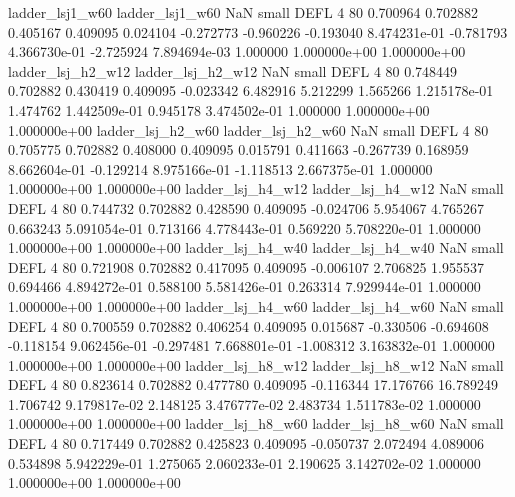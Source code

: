          ladder_lsj1_w60          ladder_lsj1_w60                   NaN      small     DEFL                 4 80 0.700964       0.702882 0.405167       0.409095    0.024104     -0.272773     -0.960226    -0.193040   8.474231e-01 -0.781793 4.366730e-01    -2.725924   7.894694e-03            1.000000    1.000000e+00        1.000000e+00
       ladder_lsj_h2_w12        ladder_lsj_h2_w12                   NaN      small     DEFL                 4 80 0.748449       0.702882 0.430419       0.409095   -0.023342      6.482916      5.212299     1.565266   1.215178e-01  1.474762 1.442509e-01     0.945178   3.474502e-01            1.000000    1.000000e+00        1.000000e+00
       ladder_lsj_h2_w60        ladder_lsj_h2_w60                   NaN      small     DEFL                 4 80 0.705775       0.702882 0.408000       0.409095    0.015791      0.411663     -0.267739     0.168959   8.662604e-01 -0.129214 8.975166e-01    -1.118513   2.667375e-01            1.000000    1.000000e+00        1.000000e+00
       ladder_lsj_h4_w12        ladder_lsj_h4_w12                   NaN      small     DEFL                 4 80 0.744732       0.702882 0.428590       0.409095   -0.024706      5.954067      4.765267     0.663243   5.091054e-01  0.713166 4.778443e-01     0.569220   5.708220e-01            1.000000    1.000000e+00        1.000000e+00
       ladder_lsj_h4_w40        ladder_lsj_h4_w40                   NaN      small     DEFL                 4 80 0.721908       0.702882 0.417095       0.409095   -0.006107      2.706825      1.955537     0.694466   4.894272e-01  0.588100 5.581426e-01     0.263314   7.929944e-01            1.000000    1.000000e+00        1.000000e+00
       ladder_lsj_h4_w60        ladder_lsj_h4_w60                   NaN      small     DEFL                 4 80 0.700559       0.702882 0.406254       0.409095    0.015687     -0.330506     -0.694608    -0.118154   9.062456e-01 -0.297481 7.668801e-01    -1.008312   3.163832e-01            1.000000    1.000000e+00        1.000000e+00
       ladder_lsj_h8_w12        ladder_lsj_h8_w12                   NaN      small     DEFL                 4 80 0.823614       0.702882 0.477780       0.409095   -0.116344     17.176766     16.789249     1.706742   9.179817e-02  2.148125 3.476777e-02     2.483734   1.511783e-02            1.000000    1.000000e+00        1.000000e+00
       ladder_lsj_h8_w60        ladder_lsj_h8_w60                   NaN      small     DEFL                 4 80 0.717449       0.702882 0.425823       0.409095   -0.050737      2.072494      4.089006     0.534898   5.942229e-01  1.275065 2.060233e-01     2.190625   3.142702e-02            1.000000    1.000000e+00        1.000000e+00
